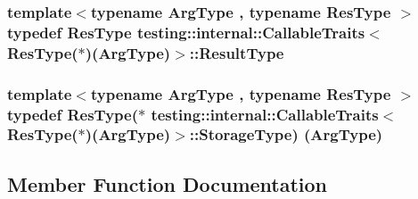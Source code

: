 \subsubsection[{\texorpdfstring{Result\+Type}{ResultType}}]{\setlength{\rightskip}{0pt plus 5cm}template$<$typename Arg\+Type , typename Res\+Type $>$ typedef Res\+Type {\bf testing\+::internal\+::\+Callable\+Traits}$<$ Res\+Type($\ast$)(Arg\+Type)$>$\+::{\bf Result\+Type}}\hypertarget{structtesting_1_1internal_1_1CallableTraits_3_01ResType_07_5_08_07ArgType_08_4_a1959235d286e9c9bb57c1c1139a0cbd8}{}\label{structtesting_1_1internal_1_1CallableTraits_3_01ResType_07_5_08_07ArgType_08_4_a1959235d286e9c9bb57c1c1139a0cbd8}
\subsubsection[{\texorpdfstring{Storage\+Type}{StorageType}}]{\setlength{\rightskip}{0pt plus 5cm}template$<$typename Arg\+Type , typename Res\+Type $>$ typedef Res\+Type($\ast$ {\bf testing\+::internal\+::\+Callable\+Traits}$<$ Res\+Type($\ast$)(Arg\+Type)$>$\+::Storage\+Type) (Arg\+Type)}\hypertarget{structtesting_1_1internal_1_1CallableTraits_3_01ResType_07_5_08_07ArgType_08_4_a0ee48af3b40e5c5bcb48a78cdacf6d9c}{}\label{structtesting_1_1internal_1_1CallableTraits_3_01ResType_07_5_08_07ArgType_08_4_a0ee48af3b40e5c5bcb48a78cdacf6d9c}


\subsection{Member Function Documentation}

